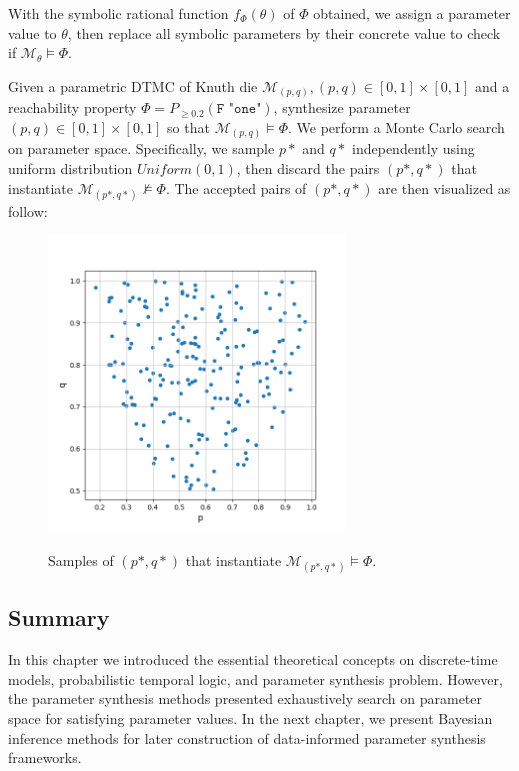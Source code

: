 With the symbolic rational function $f_\Phi(\theta)$ of $\Phi$ obtained, we assign a parameter value
to $\theta$, then replace all symbolic parameters by their concrete value to check if
$\mathcal{M}_\theta \models \Phi$.
\begin{example}
      Given a parametric DTMC of Knuth die $\mathcal{M}_{(p,q)}, (p,q)\in[0,1]\times[0,1]$ and a
      reachability property $\Phi = P_{\geq 0.2} (\texttt{F "one"})$, synthesize parameter
      $(p,q)\in[0,1]\times[0,1]$ so that $\mathcal{M}_{(p,q)} \models \Phi$. We perform a Monte
      Carlo search on parameter space. Specifically, we sample $p*$ and $q*$ independently using
      uniform distribution $Uniform(0,1)$, then discard the pairs $(p*,q*)$ that instantiate
      $\mathcal{M}_{(p*,q*)}\nvDash \Phi$. The accepted pairs of $(p*,q*)$ are then visualized as
      follow:
      \begin{figure}[H]
            \centering
            \includegraphics[width=0.7\textwidth]{figures/knuth_die_trueparams.png}
            \label{fig:knuth-die-pq-trueparams}
            \caption{Samples of $(p*,q*)$ that instantiate $\mathcal{M}_{(p*,q*)} \models \Phi$.}
      \end{figure}
\end{example}

\subsection{Summary}
In this chapter we introduced the essential theoretical concepts on discrete-time models,
probabilistic temporal logic, and parameter synthesis problem. However, the parameter synthesis
methods presented exhaustively search on parameter space for satisfying parameter values. In the
next chapter, we present Bayesian inference methods for later construction of data-informed
parameter synthesis frameworks.